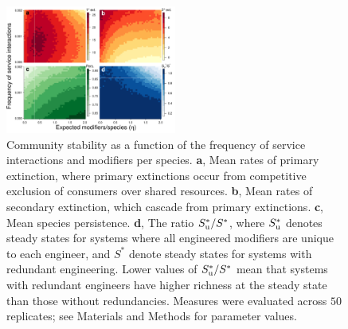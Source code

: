 \documentclass[twocolumn,preprintnumbers,amsmath,amssymb,superscriptaddress,linenumbers]{revtex4-1}
\begin{document}
\vspace{0mm}
\begin{figure}[h!]
\centering
\includegraphics[width=0.5\textwidth]{fig_engineers4.pdf}
\vspace{-8mm}
\caption{
Community stability as a function of the frequency of service interactions and modifiers per species.
\textbf{a}, Mean rates of primary extinction, where primary extinctions occur from competitive exclusion of consumers over shared resources.
\textbf{b}, Mean rates of secondary extinction, which cascade from primary extinctions.
\textbf{c}, Mean species persistence.
\textbf{d}, The ratio $S^*_{\rm u}/S^*$, where $S^*_{\rm u}$ denotes steady states for systems where all engineered modifiers are unique to each engineer, and $S^*$ denote steady states for systems with redundant engineering. Lower values of $S^*_{\rm u}/S^*$ mean that systems with redundant engineers have higher richness at the steady state than those without redundancies.
Measures were evaluated across $50$ replicates; see Materials and Methods for parameter values.
\vspace{0mm}
}
\label{fig:engineers}
\end{figure}
\end{document}
